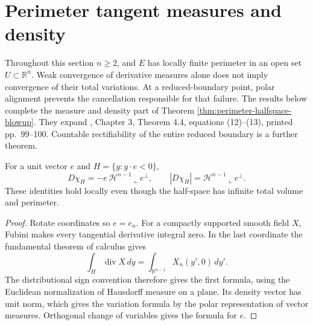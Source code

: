\chapter{Perimeter tangent measures and density}\label{sec:perimeter-tangent-measures}
Throughout this section $n\geq2$, and $E$ has locally finite perimeter in an open set $U\subset\mathbb R^n$.
Weak convergence of derivative measures alone does not imply convergence of their total variations. At a reduced-boundary point, polar alignment prevents the cancellation responsible for that failure. The results below complete the measure and density part of Theorem \ref{thm:perimeter-halfspace-blowup}. They expand \cite{Sim18}, Chapter 3, Theorem 4.4, equations (12)--(13), printed pp.~99--100. Countable rectifiability of the entire reduced boundary is a further theorem.

\begin{lemma}\label{lem:halfspace-derivative-measure}
For a unit vector $e$ and $H=\{y:y\cdot e<0\}$,
\[
 D\chi_H=-e\,\mathcal H^{n-1}\llcorner e^\perp,
 \qquad |D\chi_H|=\mathcal H^{n-1}\llcorner e^\perp.
\]
These identities hold locally even though the half-space has infinite total volume and perimeter.
\end{lemma}
\begin{proof}
Rotate coordinates so $e=e_n$. For a compactly supported smooth field $X$, Fubini makes every tangential derivative integral zero. In the last coordinate the fundamental theorem of calculus gives
\[
 \int_H\operatorname{div}X\,dy
 =\int_{\mathbb R^{n-1}}X_n(y',0)\,dy'.
\]
The distributional sign convention therefore gives the first formula, using the Euclidean normalization of Hausdorff measure on a plane. Its density vector has unit norm, which gives the variation formula by the polar representation of vector measures. Orthogonal change of variables gives the formula for $e$.
\end{proof}

